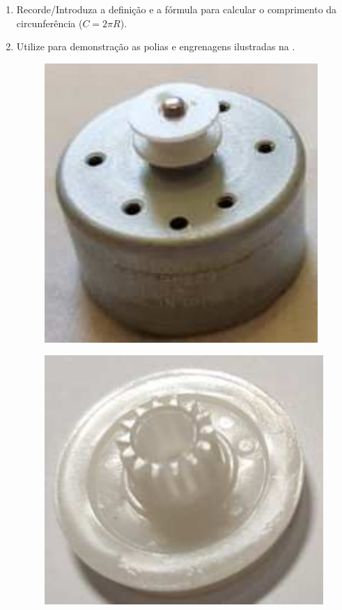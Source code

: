 \documentclass{textolivre-html}
\begin{document}
\begin{enumerate}
\item Recorde/Introduza a definição e a fórmula para calcular o comprimento da circunferência ($C = 2\pi R$).
\item Utilize para demonstração as polias e engrenagens ilustradas na .

    \begin{figure}[h!]
    \begin{minipage}{0.2\textwidth}
    \includegraphics[width=\linewidth]{figure-24.pdf}
    \label{fig17a}
    \end{minipage}
    \hfill
    \begin{minipage}{0.2\textwidth} 
    \includegraphics[width=\linewidth]{figure-25.pdf}

\end{minipage}
\end{figure}
\end{enumerate}
\end{document}
